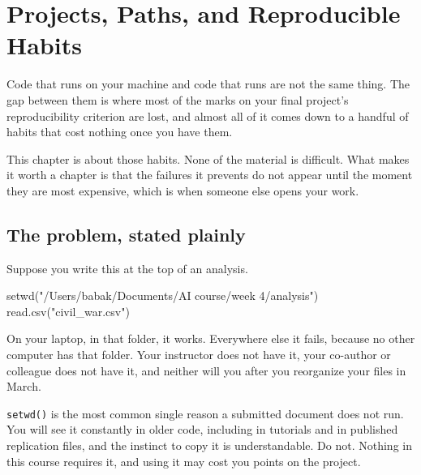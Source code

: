 \documentclass[
  a4paper,
]{scrbook}
\newenvironment{Shaded}{\begin{snugshade}}{\end{snugshade}}
\newcommand{\FunctionTok}[1]{\textcolor[rgb]{0.28,0.35,0.67}{#1}}
\newcommand{\NormalTok}[1]{\textcolor[rgb]{0.00,0.23,0.31}{#1}}
\newcommand{\StringTok}[1]{\textcolor[rgb]{0.13,0.47,0.30}{#1}}
\begin{document}
\chapter*{Projects, Paths, and Reproducible
Habits}\label{projects-paths-and-reproducible-habits}


Code that runs on your machine and code that runs are not the same
thing. The gap between them is where most of the marks on your final
project's reproducibility criterion are lost, and almost all of it comes
down to a handful of habits that cost nothing once you have them.

This chapter is about those habits. None of the material is difficult.
What makes it worth a chapter is that the failures it prevents do not
appear until the moment they are most expensive, which is when someone
else opens your work.

\section*{The problem, stated plainly}\label{the-problem-stated-plainly}


Suppose you write this at the top of an analysis.

\begin{Shaded}
\begin{Highlighting}[]
\FunctionTok{setwd}\NormalTok{(}\StringTok{"/Users/babak/Documents/AI course/week 4/analysis"}\NormalTok{)}
\FunctionTok{read.csv}\NormalTok{(}\StringTok{"civil\_war.csv"}\NormalTok{)}
\end{Highlighting}
\end{Shaded}

On your laptop, in that folder, it works. Everywhere else it fails,
because no other computer has that folder. Your instructor does not have
it, your co-author or colleague does not have it, and neither will you
after you reorganize your files in March.

\texttt{setwd()} is the most common single reason a submitted document
does not run. You will see it constantly in older code, including in
tutorials and in published replication files, and the instinct to copy
it is understandable. Do not. Nothing in this course requires it, and
using it may cost you points on the project.
\end{document}
